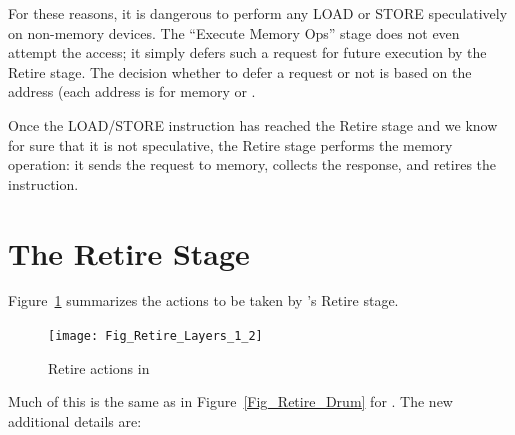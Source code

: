 For these reasons, it is dangerous to perform any LOAD or STORE
speculatively on non-memory devices.  The ``Execute Memory Ops'' stage
does not even attempt the access; it simply defers such a request for
future execution by the Retire stage.  The decision whether to defer a
request or not is based on the address (each address is for memory or .

Once the LOAD/STORE instruction has reached the Retire stage and we
know for sure that it is not speculative, the Retire stage performs
the memory operation: it sends the request to memory, collects the
response, and retires the instruction.





\section{The Retire Stage}

\label{Sec_Fife_Retire_Principles}

Figure~\ref{Fig_Fife_Retire} summarizes the actions to be taken by
{\FIFE}'s Retire stage.

\begin{figure}[htbp]
  \centerline{\texttt{[image: Fig\_Retire\_Layers\_1\_2]}}
  \caption{\label{Fig_Fife_Retire}Retire actions in {\FIFE}}
\end{figure}

Much of this is the same as in Figure~\ref{Fig_Retire_Drum} for {\DRUM}.
The new additional details are:

